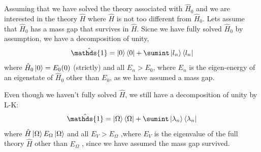 Assuming that we have solved the theory associated with $\hat{H}_0$ and we are interested in the theory $\hat{H}$ where $\hat{H}$ is not too different from $\hat{H}_0$. Lets assume that $\hat{H}_0$ has a mass gap that survives in $\hat{H}$. Sicne we have fully solved $\hat{H}_0$ by assumption, we have a decomposition of unity, 
\begin{equation}
    \hat{\mathds{1}} = \ket{0}\bra{0} + \sumint \ket{l_n} \bra{l_n}
\end{equation}
where $\hat{H}_0 \ket{0} = E_0 (0)$ (strictly) and all $E_n > E_0$, where $E_n$ is the eigen-energy of an eigenstate of $\hat{H}_0$ other than $E_0$, as we have assumed a mass gap. 

Even though we haven't fully solved $\hat{H}$, we still have a decomposition of unity by L-K: 
\begin{equation}
    \hat{\mathds{1}} = \ket{\Omega} \bra{\Omega} + \sumint \ket{\lambda_n} \bra{\lambda_n} 
\end{equation}
where $\hat{H}\ket{\Omega} E_{\Omega} \ket{\Omega}$ and all $E_V > E_{\Omega}$ ,where $E_{V}$ is the eigenvalue of the full theory $\hat{H}$ other than $E_{\Omega}$ , since we have assumed the mass gap survived.

